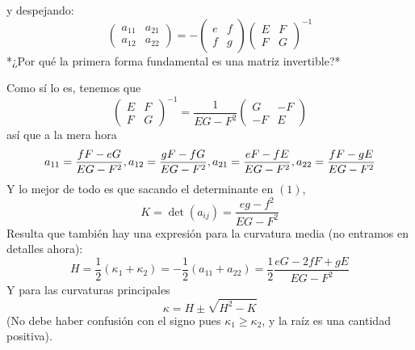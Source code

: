 \documentclass[spanish]{book}
\theoremstyle{definition}
\begin{document}
y despejando:
\begin{equation}
	\begin{pmatrix}a_{11}&a_{21}\\a_{12}&a_{22}\end{pmatrix}=-\begin{pmatrix}e&f\\f & g\end{pmatrix}\begin{pmatrix}E&F\\F&G\end{pmatrix}^{-1}
\end{equation}
*¿Por qué la primera forma fundamental es una matriz invertible?*

Como sí lo es, tenemos que 
\[\begin{pmatrix}E&F\\F&G\end{pmatrix}^{-1}=\frac{1}{EG-F^2}\begin{pmatrix}G&-F\\-F&E\end{pmatrix}\]
así que a la mera hora
\[a_{11}=\frac{fF-eG}{EG-F^2},\\
a_{12}=\frac{gF-fG}{EG-F^2},\\
a_{21}=\frac{eF-fE}{EG-F^2},\\
a_{22}=\frac{fF-gE}{EG-F^2}\]
Y lo mejor de todo es que sacando el determinante en $(1)$,
\[K=\det (a_{ij})=\frac{eg-f^2}{EG-F^2}\]
Resulta que también hay una expresión para la curvatura media (no entramos en detalles ahora):
\[H=\frac{1}{2}(\kappa_1+\kappa_2)=-\frac{1}{2}(a_{11}+a_{22})=\frac{1}{2}\frac{eG-2fF+gE}{EG-F^2}\]
Y para las curvaturas principales
\[\kappa=H\pm\sqrt{H^2-K}\]
(No debe haber confusión con el signo pues $\kappa_1\geq\kappa_2$, y la raíz es una cantidad positiva).
\end{document}
